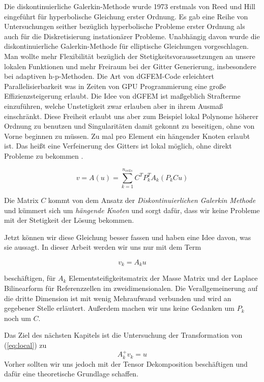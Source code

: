 Die diskontinuierliche Galerkin-Methode wurde 1973 erstmals von Reed und Hill eingeführt für hyperbolische Gleichung erster Ordnung. Es gab eine Reihe von Untersuchungen seither bezüglich hyperbolische Probleme erster Ordnung als auch für die Diskretisierung instationärer Probleme.
Unabhängig davon wurde die diskontinuierliche Galerkin-Methode für elliptische Gleichungen vorgeschlagen. Man wollte mehr Flexibilität bezüglich der Stetigkeitsvoraussetzungen an unsere lokalen Funktionen und mehr Freiraum bei der Gitter Generierung, insbesondere bei adaptiven h-p-Methoden. 
Die Art von dGFEM-Code erleichtert Parallelisierbarkeit was in Zeiten von GPU Programmierung eine große Effizienzsteigerung erlaubt. 
Die Idee von dGFEM ist maßgeblich Strafterme einzuführen, welche Unstetigkeit zwar erlauben aber in ihrem Ausmaß einschränkt. Diese Freiheit erlaubt uns aber zum Beispiel lokal Polynome höherer Ordnung zu benutzen und Singularitäten damit gekonnt zu beseitigen, ohne von Vorne beginnen zu müssen. Zu mal pro Element ein hängender Knoten erlaubt ist. Das heißt eine Verfeinerung des Gitters ist lokal möglich, ohne direkt Probleme zu bekommen \cite[292]{Numerik}.

\begin{equation} \label{eq:main3}
v=A(u)=\sum_{k=1}^{n_{cells}} C^T P_k^T A_k (P_k Cu)
\end{equation}

Die Matrix $C$ kommt von dem Ansatz der \textit{Diskontinuierlichen Galerkin Methode} und kümmert sich um \textit{hängende Knoten} und sorgt dafür, dass wir keine Probleme mit der Stetigkeit der Lösung bekommen.

Jetzt können wir diese Gleichung besser fassen und haben eine Idee davon, was sie aussagt.
In dieser Arbeit werden wir uns nur mit dem Term 

\begin{equation} \label{eq:local}
v_k = A_k u
\end{equation}

beschäftigen, für $A_k$ Elementsteifigkeitsmatrix der Masse Matrix und der Laplace Bilinearform für Referenzzellen im zweidimensionalen. Die Verallgemeinerung auf die dritte Dimension ist mit wenig Mehraufwand verbunden und wird an gegebener Stelle erläutert. Außerdem machen wir uns keine Gedanken um $P_k$ noch um $C$. 

Das Ziel des nächsten Kapitels ist die Untersuchung der Transformation von (\ref{eq:local}) zu 
\begin{equation}
A_k^{+} v_k = u  
\end{equation}
Vorher sollten wir uns jedoch mit der Tensor Dekomposition beschäftigen und dafür eine theoretische Grundlage schaffen.